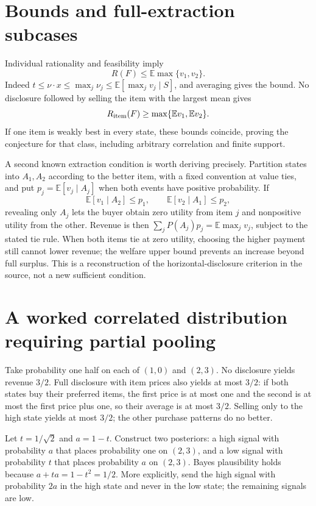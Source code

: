 \documentclass[11pt]{article}
\newcommand{\E}{\mathbb E}
\begin{document}
\section*{Bounds and full-extraction subcases}
Individual rationality and feasibility imply
\[
 R(F)\leq\E\max\{v_1,v_2\}.
\]
Indeed $t\leq\nu\cdot x\leq\max_j\nu_j\leq\E[\max_jv_j\mid S]$, and averaging gives the bound. No disclosure followed by selling the item with the largest mean gives
\[
 R_{\rm item}(F)\geq\max\{\E v_1,\E v_2\}.
\]
If one item is weakly best in every state, these bounds coincide, proving the conjecture for that class, including arbitrary correlation and finite support.

A second known extraction condition is worth deriving precisely. Partition states into $A_1,A_2$ according to the better item, with a fixed convention at value ties, and put $p_j=\E[v_j\mid A_j]$ when both events have positive probability. If
\[
 \E[v_1\mid A_2]\leq p_1,\qquad
 \E[v_2\mid A_1]\leq p_2,
\]
revealing only $A_j$ lets the buyer obtain zero utility from item $j$ and nonpositive utility from the other. Revenue is then $\sum_jP(A_j)p_j=\E\max_jv_j$, subject to the stated tie rule. When both items tie at zero utility, choosing the higher payment still cannot lower revenue; the welfare upper bound prevents an increase beyond full surplus. This is a reconstruction of the horizontal-disclosure criterion in the source, not a new sufficient condition.

\section*{A worked correlated distribution requiring partial pooling}
Take probability one half on each of $(1,0)$ and $(2,3)$. No disclosure yields revenue $3/2$. Full disclosure with item prices also yields at most $3/2$: if both states buy their preferred items, the first price is at most one and the second is at most the first price plus one, so their average is at most $3/2$. Selling only to the high state yields at most $3/2$; the other purchase patterns do no better.

Let $t=1/\sqrt2$ and $a=1-t$. Construct two posteriors: a high signal with probability $a$ that places probability one on $(2,3)$, and a low signal with probability $t$ that places probability $a$ on $(2,3)$. Bayes plausibility holds because $a+ta=1-t^2=1/2$. More explicitly, send the high signal with probability $2a$ in the high state and never in the low state; the remaining signals are low.
\end{document}
